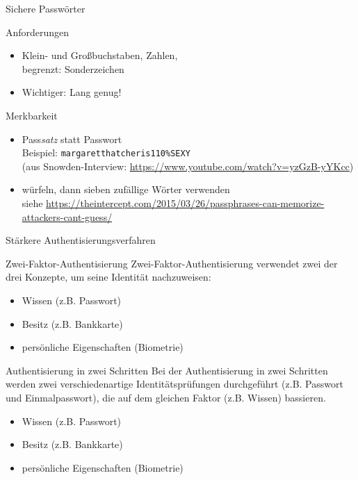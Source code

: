 \begin{frame}{Sichere Passwörter}
  \begin{block}{Anforderungen}
  \begin{itemize}
    \item Klein- und Großbuchstaben, Zahlen,\\ begrenzt: Sonderzeichen
    \item Wichtiger: Lang genug!
  \end{itemize}
  \end{block}
  \begin{block}{Merkbarkeit}
  \begin{itemize}
    \item Pass\emph{satz} statt Passwort\\
      Beispiel: \texttt{margaretthatcheris110\%SEXY}\\
      {\scriptsize (aus Snowden-Interview: \url{https://www.youtube.com/watch?v=yzGzB-yYKcc})}
    \item würfeln, dann sieben zufällige Wörter verwenden\\
      {\scriptsize siehe \url{https://theintercept.com/2015/03/26/passphrases-can-memorize-attackers-cant-guess/}}
  \end{itemize}
  \end{block}
\end{frame}

\begin{frame}{Stärkere Authentisierungsverfahren}
  \begin{block}{Zwei-Faktor-Authentisierung}
    Zwei-Faktor-Authentisierung verwendet zwei der drei Konzepte, um seine Identität nachzuweisen:
    \begin{itemize}
      \item Wissen (z.B. Passwort)
      \item Besitz (z.B. Bankkarte)
      \item persönliche Eigenschaften (Biometrie)
    \end{itemize}
  \end{block}
  \begin{block}{Authentisierung in zwei Schritten}
    Bei der Authentisierung in zwei Schritten werden zwei verschiedenartige Identitätsprüfungen durchgeführt (z.B. Passwort und Einmalpasswort), die auf dem gleichen Faktor (z.B. Wissen) bassieren.
    \begin{itemize}
      \item Wissen (z.B. Passwort)
      \item Besitz (z.B. Bankkarte)
      \item persönliche Eigenschaften (Biometrie)
    \end{itemize}
  \end{block}
\end{frame}

